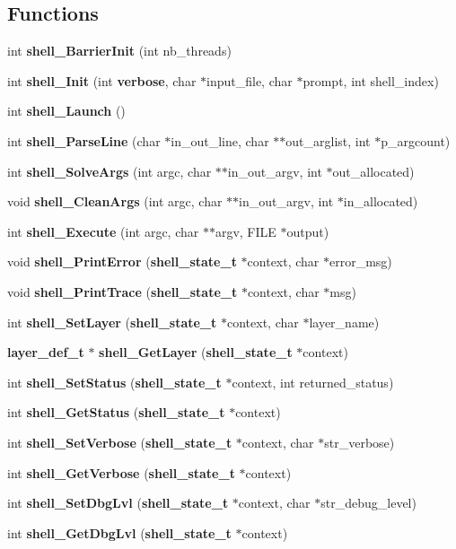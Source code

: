 \subsection*{Functions}
\begin{CompactItemize}
\item 
int {\bf shell\_\-Barrier\-Init} (int nb\_\-threads)
\item 
int {\bf shell\_\-Init} (int {\bf verbose}, char $\ast$input\_\-file, char $\ast$prompt, int shell\_\-index)
\item 
int {\bf shell\_\-Launch} ()
\item 
int {\bf shell\_\-Parse\-Line} (char $\ast$in\_\-out\_\-line, char $\ast$$\ast$out\_\-arglist, int $\ast$p\_\-argcount)
\item 
int {\bf shell\_\-Solve\-Args} (int argc, char $\ast$$\ast$in\_\-out\_\-argv, int $\ast$out\_\-allocated)
\item 
void {\bf shell\_\-Clean\-Args} (int argc, char $\ast$$\ast$in\_\-out\_\-argv, int $\ast$in\_\-allocated)
\item 
int {\bf shell\_\-Execute} (int argc, char $\ast$$\ast$argv, FILE $\ast$output)
\item 
void {\bf shell\_\-Print\-Error} ({\bf shell\_\-state\_\-t} $\ast$context, char $\ast$error\_\-msg)
\item 
void {\bf shell\_\-Print\-Trace} ({\bf shell\_\-state\_\-t} $\ast$context, char $\ast$msg)
\item 
int {\bf shell\_\-Set\-Layer} ({\bf shell\_\-state\_\-t} $\ast$context, char $\ast$layer\_\-name)
\item 
{\bf layer\_\-def\_\-t} $\ast$ {\bf shell\_\-Get\-Layer} ({\bf shell\_\-state\_\-t} $\ast$context)
\item 
int {\bf shell\_\-Set\-Status} ({\bf shell\_\-state\_\-t} $\ast$context, int returned\_\-status)
\item 
int {\bf shell\_\-Get\-Status} ({\bf shell\_\-state\_\-t} $\ast$context)
\item 
int {\bf shell\_\-Set\-Verbose} ({\bf shell\_\-state\_\-t} $\ast$context, char $\ast$str\_\-verbose)
\item 
int {\bf shell\_\-Get\-Verbose} ({\bf shell\_\-state\_\-t} $\ast$context)
\item 
int {\bf shell\_\-Set\-Dbg\-Lvl} ({\bf shell\_\-state\_\-t} $\ast$context, char $\ast$str\_\-debug\_\-level)
\item 
int {\bf shell\_\-Get\-Dbg\-Lvl} ({\bf shell\_\-state\_\-t} $\ast$context)
\item 

\end{CompactItemize}
